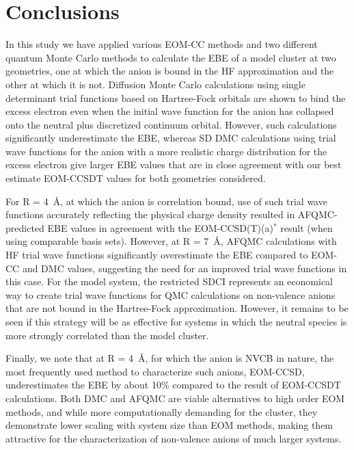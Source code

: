 \section{Conclusions}
In this study we have applied various EOM-CC methods and two different quantum Monte Carlo methods to calculate the EBE of a model  cluster at two geometries, one at which the anion is bound in the HF approximation and the other at which it is not.
Diffusion Monte Carlo calculations using single determinant trial functions based on Hartree-Fock orbitals are shown to bind the excess electron even when the initial wave function for the anion has collapsed onto the neutral plus discretized continuum orbital. 
However, such calculations significantly underestimate the EBE, whereas SD DMC calculations using trial wave functions for the anion with a more realistic charge distribution for the excess electron give larger EBE values that are in close agreement with our best estimate EOM-CCSDT values for both geometries considered.

For R = \SI{4}{\angstrom}, at which the anion is correlation bound, use of such trial wave functions accurately reflecting the physical charge density resulted in AFQMC-predicted EBE values in agreement with the EOM-CCSD(T)(a)$^*$ result (when using comparable basis sets). 
However, at R = \SI{7}{\angstrom}, AFQMC calculations with HF trial wave functions significantly overestimate the EBE compared to EOM-CC and DMC values, suggesting the need for an improved trial wave functions in this case.
For the  model system, the restricted SDCI represents an economical way to create trial wave functions for QMC calculations on non-valence anions that are not bound in the Hartree-Fock approximation. 
However, it remains to be seen if this strategy will be as effective for systems in which the neutral species is more strongly correlated than the model  cluster.

Finally, we note that at R = \SI{4}{\angstrom}, for which the anion is NVCB in nature, the most frequently used method to characterize such anions, EOM-CCSD, underestimates the EBE by about 10\% compared to the result of EOM-CCSDT calculations. 
Both DMC and AFQMC are viable alternatives to high order EOM methods, and while more computationally demanding for the  cluster, they demonstrate lower scaling with system size than EOM methods, making them attractive for the characterization of non-valence anions of much larger systems.

